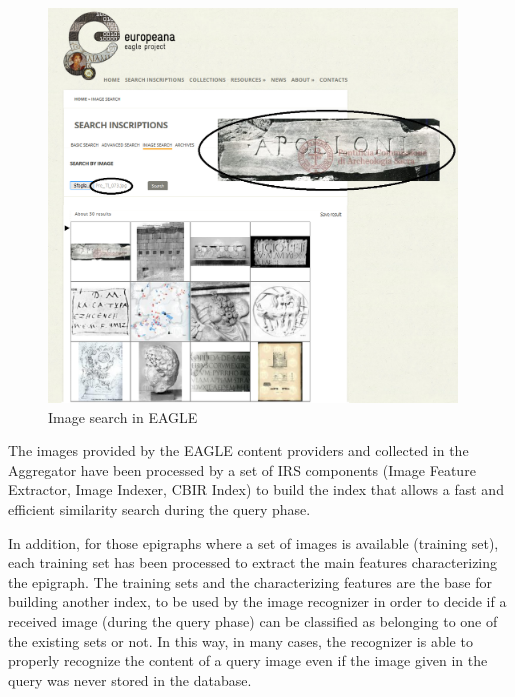 \documentclass[amsthm,ebook]{saparticle}
\begin{document}
\begin{figure}[!bp]
\centering
 \includegraphics[width=10.848cm,height=10.451cm]{EAGLE2016submissionXX-img002.png} 
\caption{Image search in EAGLE}
\label{figure2}
\end{figure}

The images provided by the EAGLE content providers and collected in the Aggregator have been processed by a set of IRS
components (Image Feature Extractor, Image Indexer, CBIR Index) to build the index that allows a fast and efficient
similarity search during the query phase.

In addition, for those epigraphs where a set of images is available (training set), each training set has been processed
to extract the main features characterizing the epigraph. The training sets and the characterizing features are the
base for building another index, to be used by the image recognizer in order to decide if a received image (during the
query phase) can be classified as belonging to one of the existing sets or not. In this way, in many cases, the
recognizer is able to properly recognize the content of a query image even if the image given in the query was never
stored in the database.
\end{document}
